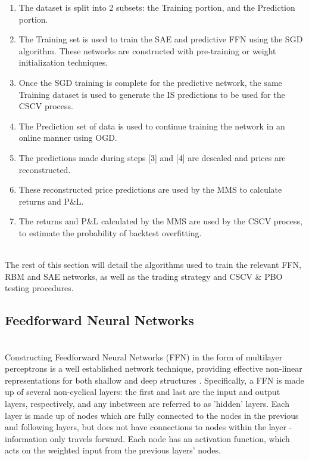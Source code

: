 \documentclass[a4paper,11pt,oneside]{article}
\theoremstyle{plain}
\theoremstyle{definition}
\begin{document}
	\begin{enumerate}
		\item The dataset is split into 2 subsets: the Training portion, and the Prediction portion.
		\item The Training set is used to train the SAE and predictive FFN using the SGD algorithm. These networks are constructed with pre-training or weight initialization techniques.
		\item Once the SGD training is complete for the predictive network, the same Training dataset is used to generate the IS predictions to be used for the CSCV process.
		\item The Prediction set of data is used to continue training the network in an online manner using OGD.
		\item The predictions made during steps [3] and [4] are descaled and prices are reconstructed.
		\item These reconstructed price predictions are used by the MMS to calculate returns and P\&L.
		\item The returns and P\&L calculated by the MMS are used by the CSCV process, to estimate the probability of backtest overfitting.
	\end{enumerate}
	~\\
	The rest of this section will detail the algorithms used to train the relevant FFN, RBM and SAE networks, as well as the trading strategy and CSCV \& PBO testing procedures.
	
	\subsection{Feedforward Neural Networks}\label{imp_ffn}
	~\\
	Constructing Feedforward Neural Networks (FFN) in the form of multilayer perceptrons is a well established network technique, providing effective non-linear representations for both shallow and deep structures \citep{Schmidhuber}. Specifically, a FFN is made up of several non-cyclical layers: the first and last are the input and output layers, respectively, and any inbetween are referred to as 'hidden' layers. Each layer is made up of nodes which are fully connected to the nodes in the previous and following layers, but does not have connections to nodes within the layer - information only travels forward. Each 
	node has an activation function, which acts on the weighted input from the previous layers' nodes.
	
\end{document}
